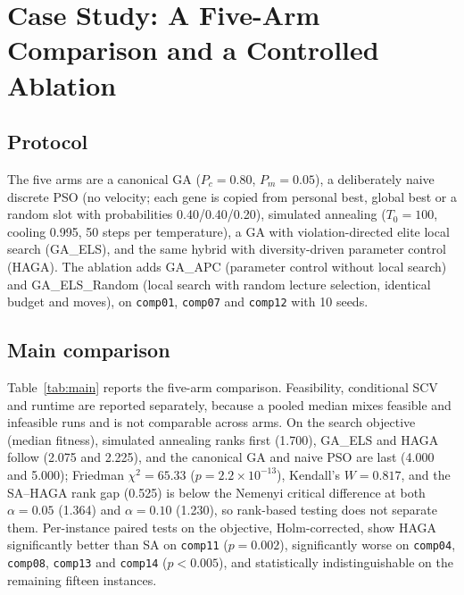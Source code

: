 \documentclass[journal]{IEEEtran}
\newcommand{\code}[1]{\texttt{#1}}
\begin{document}
\section{Case Study: A Five-Arm Comparison and a Controlled Ablation}
\subsection{Protocol}
The five arms are a canonical GA ($P_c=0.80$, $P_m=0.05$), a deliberately naive discrete PSO (no velocity; each gene is copied from personal best, global best or a random slot with probabilities 0.40/0.40/0.20), simulated annealing ($T_0=100$, cooling 0.995, 50 steps per temperature), a GA with violation-directed elite local search (GA\_ELS), and the same hybrid with diversity-driven parameter control (HAGA). The ablation adds GA\_APC (parameter control without local search) and GA\_ELS\_Random (local search with random lecture selection, identical budget and moves), on \code{comp01}, \code{comp07} and \code{comp12} with 10 seeds.

\subsection{Main comparison}
Table~\ref{tab:main} reports the five-arm comparison. Feasibility, conditional SCV and runtime are reported separately, because a pooled median mixes feasible and infeasible runs and is not comparable across arms. On the search objective (median fitness), simulated annealing ranks first (1.700), GA\_ELS and HAGA follow (2.075 and 2.225), and the canonical GA and naive PSO are last (4.000 and 5.000); Friedman $\chi^2=65.33$ ($p=2.2\times10^{-13}$), Kendall's $W=0.817$, and the SA--HAGA rank gap (0.525) is below the Nemenyi critical difference at both $\alpha=0.05$ (1.364) and $\alpha=0.10$ (1.230), so rank-based testing does not separate them. Per-instance paired tests on the objective, Holm-corrected, show HAGA significantly better than SA on \code{comp11} ($p=0.002$), significantly worse on \code{comp04}, \code{comp08}, \code{comp13} and \code{comp14} ($p<0.005$), and statistically indistinguishable on the remaining fifteen instances.
\end{document}
